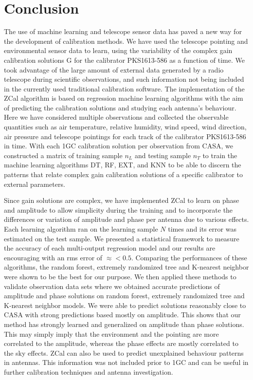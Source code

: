 \chapter{Conclusion}

The use of machine learning and telescope sensor data has paved a new way for the development of calibration methods. We have used the telescope pointing and environmental sensor data to learn, using the variability of the complex gain calibration solutions G for the calibrator PKS1613-586 as a function of time. We took advantage of the large amount of external data generated by a radio telescope during scientific observations, and such information not being included in the currently used traditional calibration software. The implementation of the ZCal algorithm is based on regression machine learning algorithms with the aim of predicting the calibration solutions and studying each antenna's behaviour. Here we have considered multiple observations and collected the observable quantities such as air temperature, relative humidity, wind speed, wind direction, air pressure and telescope pointings for each track of the calibrator PKS1613-586 in time. With each 1GC calibration solution per observation from CASA, we constructed a matrix of training sample $n_L$ and testing sample $n_T$ to train the machine learning algorithms DT, RF, EXT, and KNN to be able to discern the patterns that relate complex gain  calibration solutions of a specific calibrator to external parameters.       

Since gain solutions are complex, we have implemented  ZCal to learn on phase and amplitude to allow simplicity during the training and to incorporate the differences or variation of amplitude and phase per antenna due to various effects. Each learning algorithm ran on the learning sample $N$ times and its error was estimated on the test sample. We presented a statistical framework to measure the accuracy of each multi-output regression model and our results are encouraging with an rms error of $\approx < 0.5$. Comparing the performances of these algorithms, the random forest, extremely randomized tree and K-nearest neighbor were shown to be the best for our purpose. We then applied these methods to validate observation data sets where we obtained accurate predictions of amplitude and phase solutions on random forest, extremely randomized tree and K-nearest neighbor models. We were able to predict solutions reasonably close to CASA with strong predictions based mostly on amplitude. This shows that our method has strongly learned and generalized on amplitude than phase solutions. This may simply imply that the environment and the pointing are more correlated to the amplitude, whereas the phase effects are mostly correlated to the sky effects. ZCal can also be used to predict unexplained behaviour patterns in antennas. This information was not included prior to 1GC and can be useful in further calibration techniques and antenna investigation.

